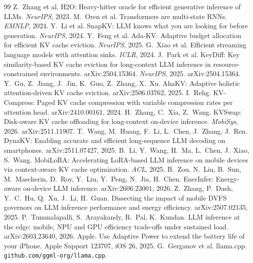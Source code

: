 \documentclass[11pt]{article}
\begin{document}
\begin{thebibliography}{99}\small\setlength{\itemsep}{0pt}
 Z.~Zhang et al. H2O: Heavy-hitter oracle for efficient generative inference of
LLMs. \emph{NeurIPS}, 2023.
 M.~Oren et al. Transformers are multi-state RNNs. \emph{EMNLP}, 2024.
 Y.~Li et al. SnapKV: LLM knows what you are looking for before generation.
\emph{NeurIPS}, 2024.
 Y.~Feng et al. Ada-KV: Adaptive budget allocation for efficient KV cache
eviction. \emph{NeurIPS}, 2025.
 G.~Xiao et al. Efficient streaming language models with attention
sinks. \emph{ICLR}, 2024.
 J.~Park et al. KeyDiff: Key similarity-based KV cache eviction for long-context LLM inference in resource-constrained environments. arXiv:2504.15364.
\emph{NeurIPS}, 2025. arXiv:2504.15364.
 Y.~Gu, Z.~Jiang, J.~Jin, K.~Guo, Z.~Zhang, X.~Xu. AhaKV: Adaptive holistic attention-driven KV cache eviction. arXiv:2506.03762, 2025.
 I.~Rehg. KV-Compress: Paged KV cache compression with variable
compression rates per attention head. arXiv:2410.00161, 2024.
 H.~Zhang, C.~Xia, Z.~Wang. KVSwap: Disk-aware KV cache offloading for long-context on-device inference. \emph{MobiSys}, 2026. arXiv:2511.11907.
 T.~Wang, M.~Huang, F.~Li, L.~Chen, J.~Zhang, J.~Ren. DynaKV: Enabling accurate and efficient long-sequence LLM decoding on smartphones. arXiv:2511.07427, 2025.
 B.~Li, Y.~Wang, H.~Ma, L.~Chen, J.~Xiao, S.~Wang. MobiLoRA: Accelerating LoRA-based LLM inference on mobile devices via context-aware KV cache optimization. \emph{ACL}, 2025.
 B.~Zou, N.~Liu, B.~Sun, M.~Mascherin, D.~Roy, Y.~Liu, Y.~Peng, N.~Jia, H.~Chen. EnerInfer: Energy-aware on-device LLM inference. arXiv:2606.23001, 2026.
 Z.~Zhang, P.~Dash, Y.~C.~Hu, Q.~Xu, J.~Li, H.~Guan. Dissecting the impact of mobile DVFS governors on LLM inference performance and energy efficiency. arXiv:2507.02135, 2025.
 P.~Tummalapalli, S.~Arayakandy, R.~Pal, K.~Kundan. LLM inference at the edge: mobile, NPU and GPU efficiency trade-offs under sustained load. arXiv:2603.23640, 2026.
 Apple. Use Adaptive Power to extend the battery life of your iPhone. Apple Support 123707, iOS 26, 2025.
 G.~Gerganov et al. llama.cpp. \texttt{github.com/ggml-org/llama.cpp}.
\end{thebibliography}
\end{document}
